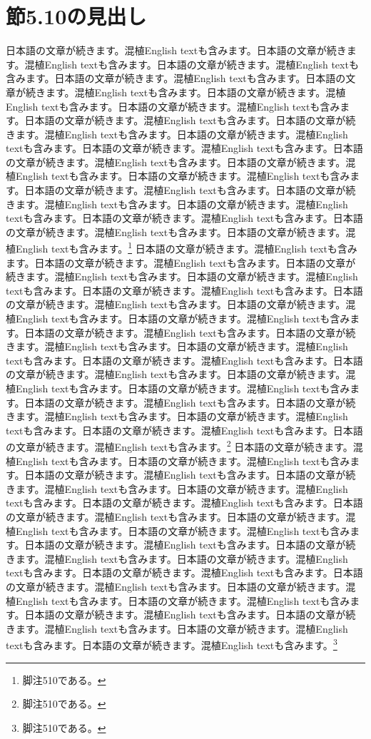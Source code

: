 \documentclass[pdflatex,book]{jlreq}
\begin{document}
\section{節5.10の見出し}
日本語の文章が続きます。混植English textも含みます。日本語の文章が続きます。混植English textも含みます。日本語の文章が続きます。混植English textも含みます。日本語の文章が続きます。混植English textも含みます。日本語の文章が続きます。混植English textも含みます。日本語の文章が続きます。混植English textも含みます。日本語の文章が続きます。混植English textも含みます。日本語の文章が続きます。混植English textも含みます。日本語の文章が続きます。混植English textも含みます。日本語の文章が続きます。混植English textも含みます。日本語の文章が続きます。混植English textも含みます。日本語の文章が続きます。混植English textも含みます。日本語の文章が続きます。混植English textも含みます。日本語の文章が続きます。混植English textも含みます。日本語の文章が続きます。混植English textも含みます。日本語の文章が続きます。混植English textも含みます。日本語の文章が続きます。混植English textも含みます。日本語の文章が続きます。混植English textも含みます。日本語の文章が続きます。混植English textも含みます。日本語の文章が続きます。混植English textも含みます。\footnote{脚注510である。}
日本語の文章が続きます。混植English textも含みます。日本語の文章が続きます。混植English textも含みます。日本語の文章が続きます。混植English textも含みます。日本語の文章が続きます。混植English textも含みます。日本語の文章が続きます。混植English textも含みます。日本語の文章が続きます。混植English textも含みます。日本語の文章が続きます。混植English textも含みます。日本語の文章が続きます。混植English textも含みます。日本語の文章が続きます。混植English textも含みます。日本語の文章が続きます。混植English textも含みます。日本語の文章が続きます。混植English textも含みます。日本語の文章が続きます。混植English textも含みます。日本語の文章が続きます。混植English textも含みます。日本語の文章が続きます。混植English textも含みます。日本語の文章が続きます。混植English textも含みます。日本語の文章が続きます。混植English textも含みます。日本語の文章が続きます。混植English textも含みます。日本語の文章が続きます。混植English textも含みます。日本語の文章が続きます。混植English textも含みます。日本語の文章が続きます。混植English textも含みます。\footnote{脚注510である。}
日本語の文章が続きます。混植English textも含みます。日本語の文章が続きます。混植English textも含みます。日本語の文章が続きます。混植English textも含みます。日本語の文章が続きます。混植English textも含みます。日本語の文章が続きます。混植English textも含みます。日本語の文章が続きます。混植English textも含みます。日本語の文章が続きます。混植English textも含みます。日本語の文章が続きます。混植English textも含みます。日本語の文章が続きます。混植English textも含みます。日本語の文章が続きます。混植English textも含みます。日本語の文章が続きます。混植English textも含みます。日本語の文章が続きます。混植English textも含みます。日本語の文章が続きます。混植English textも含みます。日本語の文章が続きます。混植English textも含みます。日本語の文章が続きます。混植English textも含みます。日本語の文章が続きます。混植English textも含みます。日本語の文章が続きます。混植English textも含みます。日本語の文章が続きます。混植English textも含みます。日本語の文章が続きます。混植English textも含みます。日本語の文章が続きます。混植English textも含みます。\footnote{脚注510である。}
\end{document}
